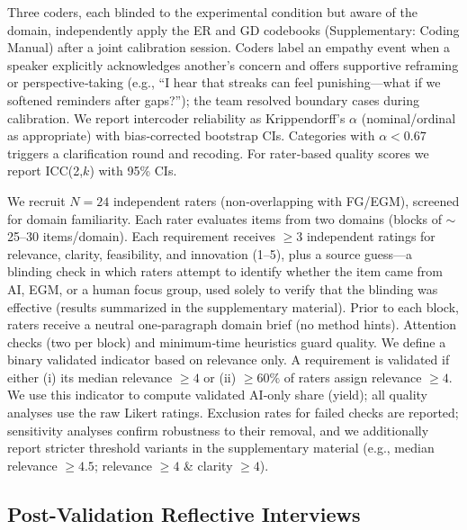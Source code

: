 \documentclass[acmsmall]{acmart}
\begin{document}
Three coders, each blinded to the experimental condition but aware of the domain, independently apply the ER and GD codebooks (Supplementary: Coding Manual) after a joint calibration session. Coders label an empathy event when a speaker explicitly acknowledges another’s concern and offers supportive reframing or perspective‑taking (e.g., “I hear that streaks can feel punishing—what if we softened reminders after gaps?”); the team resolved boundary cases during calibration.
 We report intercoder reliability as Krippendorff’s $\alpha$ (nominal/ordinal as appropriate) with bias‑corrected bootstrap CIs. Categories with $\alpha{<}0.67$ triggers a clarification round and recoding. For rater‑based quality scores we report ICC(2,$k$) with 95\% CIs.

We recruit $N{=}24$ independent raters (non‑overlapping with FG/EGM), screened for domain familiarity. Each rater evaluates items from two domains (blocks of $\sim$25--30 items/domain). Each requirement receives $\geq 3$ independent ratings for relevance, clarity, feasibility, and innovation (1--5), plus a source guess---a blinding check in which raters attempt to identify whether the item came from AI, EGM, or a human focus group, used solely to verify that the blinding was effective (results summarized in the supplementary material). Prior to each block, raters receive a neutral one‑paragraph domain brief (no method hints). Attention checks (two per block) and minimum‑time heuristics guard quality. We define a binary validated indicator based on relevance only. A requirement is validated if either (i) its median relevance $\geq 4$ or (ii) $\geq 60\%$ of raters assign relevance $\geq 4$. We use this indicator to compute validated AI‑only share (yield); all quality analyses use the raw Likert ratings. Exclusion rates for failed checks are reported; sensitivity analyses confirm robustness to their removal, and we additionally report stricter threshold variants in the supplementary material (e.g., median relevance $\geq 4.5$; relevance $\geq 4$ \& clarity $\geq 4$).


\subsection{Post-Validation Reflective Interviews}
\label{sec:reflective-interviews}
\end{document}
